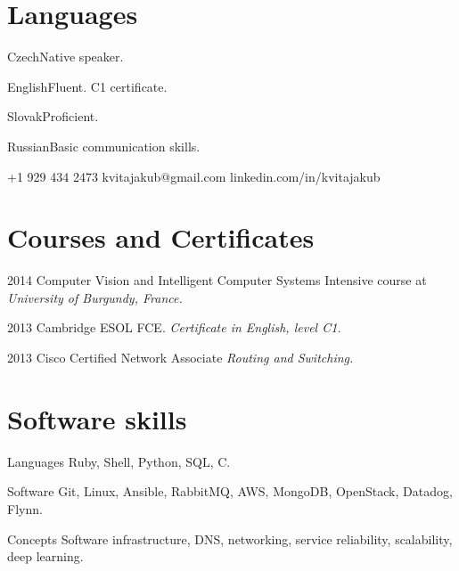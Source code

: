 \documentclass{tccv}
\begin{document}
\section{Languages}

\begin{factlist}
	\item{Czech}{Native speaker.}
	\item{English}{Fluent. C1 certificate.}
	\item{Slovak}{Proficient.}
	\item{Russian}{Basic communication skills.}
\end{factlist}

{+1 929 434 2473}
{kvitajakub@gmail.com}
{linkedin.com/in/kvitajakub}

\section{Courses and Certificates}

\begin{yearlist}
	
	\item{2014}
	{Computer Vision and Intelligent Computer Systems}
	{Intensive course at \emph{University of Burgundy, France.}}
	
	\item{2013}
	{Cambridge ESOL FCE.}
	{\emph{Certificate in English, level C1.}}
	
	\item{2013}
	{Cisco Certified Network Associate}
	{\emph{Routing and Switching.}}
	
	
\end{yearlist}

\section{Software skills}

\begin{factlist}
	
	\item{Languages}
	{Ruby, Shell, Python, SQL, C.}
	
	\item{Software}
	{Git, Linux, Ansible, RabbitMQ, AWS, MongoDB, OpenStack, Datadog, Flynn.}
	
	\item{Concepts}
	{Software infrastructure, DNS, networking, service reliability, scalability, deep learning.}
	
\end{factlist}
\end{document}
